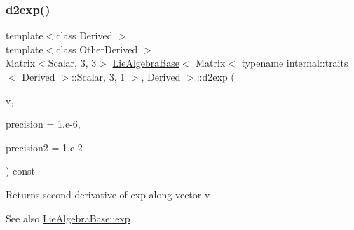 \subsubsection{\texorpdfstring{d2exp()}{d2exp()}\hspace{0.1cm}{\footnotesize\ttfamily [1/2]}}
{\footnotesize\ttfamily template$<$class Derived $>$ \\
template$<$class Other\+Derived $>$ \\
Matrix$<$Scalar, 3, 3$>$ \hyperlink{class_lie_algebra_base}{Lie\+Algebra\+Base}$<$ Matrix$<$ typename internal\+::traits$<$ Derived $>$\+::Scalar, 3, 1 $>$, Derived $>$\+::d2exp (\begin{DoxyParamCaption}\item[{const Matrix\+Base$<$ Other\+Derived $>$ \&}]{v,  }\item[{Scalar}]{precision = {\ttfamily 1.e-\/6},  }\item[{Scalar}]{precision2 = {\ttfamily 1.e-\/2} }\end{DoxyParamCaption}) const\hspace{0.3cm}{\ttfamily [inline]}}

\begin{DoxyReturn}{Returns}
second derivative of exp along vector {\ttfamily v} 
\end{DoxyReturn}
\begin{DoxySeeAlso}{See also}
\hyperlink{class_lie_algebra_base_aafe7d43a29d43aed54dd91b3a3a4c9f7}{Lie\+Algebra\+Base\+::exp} 
\end{DoxySeeAlso}
\hypertarget{class_lie_algebra_base_3_01_matrix_3_01typename_01internal_1_1traits_3_01_derived_01_4_1_1_scalabfa0bdce6d9781ee940346c3f6d91f4e_a8fec2455fc2fca1f7d4683b1f78d67ec}{}\label{class_lie_algebra_base_3_01_matrix_3_01typename_01internal_1_1traits_3_01_derived_01_4_1_1_scalabfa0bdce6d9781ee940346c3f6d91f4e_a8fec2455fc2fca1f7d4683b1f78d67ec} 
